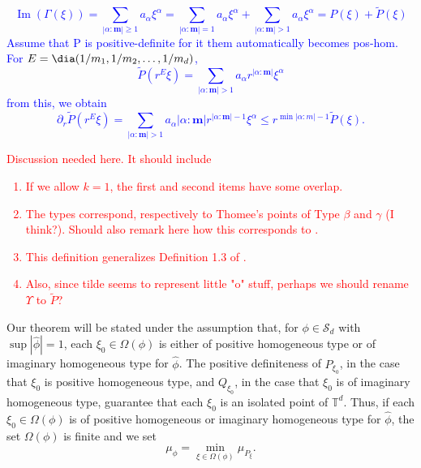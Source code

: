 \documentclass[11pt]{article}
\renewcommand\Im{\operatorname{Im}}
\begin{document}
\textcolor{blue}{
\begin{equation*}
\Im(\Gamma(\xi))=\sum_{|\alpha:\mathbf{m}|\geq 1}a_{\alpha}\xi^\alpha=\sum_{|\alpha:\mathbf{m}|= 1}a_{\alpha}\xi^\alpha+\sum_{|\alpha:\mathbf{m}|> 1}a_{\alpha}\xi^\alpha=P(\xi)+\widetilde{P}(\xi)
\end{equation*}
Assume that P is positive-definite for it them automatically becomes pos-hom. For $E=\dia(1/m_1,1/m_2,\dots,1/m_d)$, 
\begin{equation*}
    \widetilde{P}(r^E\xi)=\sum_{|\alpha:\mathbf{m}|>1}a_{\alpha}r^{|\alpha:\mathbf{m}|}\xi^{\alpha}
\end{equation*}
from this, we obtain
\begin{equation*}
    \partial_r\widetilde{P}(r^E\xi)=\sum_{|\alpha:\mathbf{m}|>1}a_{\alpha}|\alpha:\mathbf{m}|r^{|\alpha:\mathbf{m}|-1}\xi^{\alpha}\leq r^{\min{|\alpha:m|-1}}\widetilde{P}(\xi).
\end{equation*}
}
\textcolor{red}{Discussion needed here. It should include
\begin{enumerate}
    \item If we allow $k=1$, the first and second items have some overlap. 
    \item The types correspond, respectively to Thomee's points of Type $\beta$ and $\gamma$ (I think?). Should also remark here how this corresponds to \cite{Randles2015}.
    \item This definition generalizes Definition 1.3 of \cite{Randles2017}.
    \item Also, since tilde seems to represent little "o" stuff, perhaps we should rename $\Upsilon$ to $\widetilde{P}$?
\end{enumerate}}
Our theorem will be stated under the assumption that, for $\phi\in\mathcal{S}_d$ with $\sup|\widehat{\phi}|=1$, each $\xi_0\in\Omega(\phi)$ is either of positive homogeneous type or of imaginary homogeneous type for $\widehat\phi$. The positive definiteness of $P_{\xi_0}$, in the case that $\xi_0$ is positive homogeneous type, and $Q_{\xi_0}$, in the case that $\xi_0$ is of imaginary homogeneous type, guarantee that each $\xi_0$ is an isolated point of $\mathbb{T}^d$. Thus, if each $\xi_0\in\Omega(\phi)$ is of positive homogeneous or imaginary homogeneous type for $\widehat{\phi}$, the set $\Omega(\phi)$ is finite and we set
\begin{equation*}
    \mu_{\phi}=\min_{\xi\in\Omega(\phi)}\mu_{P_\xi}.
\end{equation*}
\end{document}
